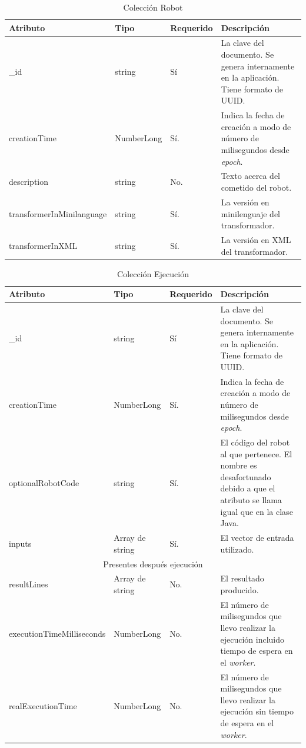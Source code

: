 \begin{table}[hbp]
\begin{tabularx}{\textwidth}{|l|l|l|X|}
\hline
Atributo & Tipo & Requerido & Descripción \\ \hline
\_id & string & Sí & La clave del documento. Se genera internamente en la
aplicación. Tiene formato de UUID. \\ \hline
creationTime & NumberLong & Sí. & Indica la fecha de creación a modo de
número de milisegundos desde \emph{epoch}. \\ \hline
description & string & No. & Texto acerca del cometido del
robot. \\ \hline
transformerInMinilanguage & string & Sí. & La versión en minilenguaje
del transformador. \\ \hline
transformerInXML & string & Sí. & La versión en XML del transformador. \\ \hline
\end{tabularx}
\caption{Colección Robot}
\label{robot_collection}
\end{table}

\begin{table}[hbp]
\begin{tabularx}{\textwidth}{|l|l|l|X|}
\hline
Atributo & Tipo & Requerido & Descripción \\ \hline
\_id & string & Sí & La clave del documento. Se genera internamente en la
aplicación. Tiene formato de UUID. \\ \hline
creationTime & NumberLong & Sí. & Indica la fecha de creación a modo de
número de milisegundos desde \emph{epoch}. \\ \hline
optionalRobotCode & string & Sí. & El código del robot al que
pertenece. El nombre es desafortunado debido a que el atributo se
llama igual que en la clase Java.\\ \hline
inputs & Array de string & Sí. & El vector de entrada
utilizado. \\ \hline
\multicolumn{4}{c}{Presentes después ejecución} \\ \hline
resultLines & Array de string & No. & El resultado
producido. \\ \hline
executionTimeMilliseconds & NumberLong & No. & El número de
milisegundos que llevo realizar la ejecución incluido tiempo de espera
en el \emph{worker}. \\ \hline
realExecutionTime & NumberLong & No. & El número de
milisegundos que llevo realizar la ejecución sin tiempo de espera
en el \emph{worker}. \\ \hline
\end{tabularx}
\caption{Colección Ejecución}
\label{execution_collection}
\end{table}

